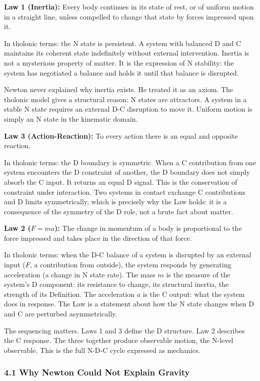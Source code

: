 \documentclass[
  11pt,
  letterpaper,
]{article}
\begin{document}
\textbf{Law 1 (Inertia):} Every body continues in its state of rest, or
of uniform motion in a straight line, unless compelled to change that
state by forces impressed upon it.

In tholonic terms: the N state is persistent. A system with balanced D
and C maintains its coherent state indefinitely without external
intervention. Inertia is not a mysterious property of matter. It is the
expression of N stability: the system has negotiated a balance and holds
it until that balance is disrupted.

Newton never explained why inertia exists. He treated it as an axiom.
The tholonic model gives a structural reason: N states are attractors. A
system in a stable N state requires an external D-C disruption to move
it. Uniform motion is simply an N state in the kinematic domain.

\textbf{Law 3 (Action-Reaction):} To every action there is an equal and
opposite reaction.

In tholonic terms: the D boundary is symmetric. When a C contribution
from one system encounters the D constraint of another, the D boundary
does not simply absorb the C input. It returns an equal D signal. This
is the conservation of constraint under interaction. Two systems in
contact exchange C contributions and D limits symmetrically, which is
precisely why the Law holds: it is a consequence of the symmetry of the
D role, not a brute fact about matter.

\textbf{Law 2 (\(F = ma\)):} The change in momentum of a body is
proportional to the force impressed and takes place in the direction of
that force.

In tholonic terms: when the D-C balance of a system is disrupted by an
external input (\(F\), a contribution from outside), the system responds
by generating acceleration (a change in N state rate). The mass \(m\) is
the measure of the system's D component: its resistance to change, its
structural inertia, the strength of its Definition. The acceleration
\(a\) is the C output: what the system does in response. The Law is a
statement about how the N state changes when D and C are perturbed
asymmetrically.

The sequencing matters. Laws 1 and 3 define the D structure. Law 2
describes the C response. The three together produce observable motion,
the N-level observable. This is the full N-D-C cycle expressed as
mechanics.

\subsubsection{4.1 Why Newton Could Not Explain
Gravity}\label{why-newton-could-not-explain-gravity}
\end{document}
